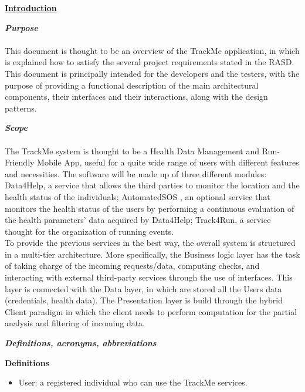 	\underline{\textbf{Introduction} }
	\begin{legal}
    		\item \textit{\textbf{Purpose}}\\\\
		This document is thought to be an overview of the TrackMe application, in which is explained how to satisfy the several project requirements stated in the RASD. This document is principally intended for the developers and the testers, with the purpose of providing a functional description of the main architectural components, their interfaces and their interactions, along with the design patterns.\\
		\item \textit{\textbf{Scope}}\\\\
		The TrackMe system is thought to be a Health Data Management and Run-Friendly Mobile App, useful for a quite wide range of users with different features and necessities. The software will be made up of three different modules: Data4Help, a service that allows the third parties to monitor the location and the health status
of the individuals; AutomatedSOS , an optional service that monitors the health status of the users by performing
a continuous evaluation of the health parameters' data acquired by Data4Help; Track4Run, a service thought for the organization of running events.\\ 
		To provide the previous services in the best way, the overall system is structured in a multi-tier architecture. More specifically, the Business logic layer has the task of taking charge of the incoming requests/data, computing checks, and interacting with external third-party services through the use of interfaces. This layer is connected with the Data layer, in which are stored all the Users data (credentials, health data). The Presentation layer is build through the hybrid Client paradigm in which the client needs to perform computation for the partial analysis and filtering of incoming data. \\
		\item \textit{\textbf{Definitions, acronyms, abbreviations}}\\
			\begin{legal}
				\item \textbf{Definitions}\\
				\begin{itemize}
					\item User: a registered individual who can use the TrackMe services.

\end{itemize}
\end{legal}
\end{legal}
